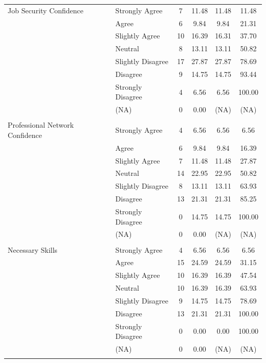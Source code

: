 \documentclass{article}
\begin{document}
\begin{longtable}{llcccc}
        Job Security Confidence & Strongly Agree & 7 & 11.48 & 11.48 & 11.48 \\
        & Agree & 6 & 9.84 & 9.84 & 21.31 \\
        & Slightly Agree & 10 & 16.39 & 16.31 & 37.70 \\
        & Neutral & 8 & 13.11 & 13.11 & 50.82 \\
        & Slightly Disagree & 17 & 27.87 & 27.87 & 78.69 \\
        & Disagree & 9 & 14.75 & 14.75 & 93.44 \\
        & Strongly Disagree & 4 & 6.56 & 6.56 & 100.00 \\
        & (NA) & 0 & 0.00 & (NA) & (NA)\\\\

        Professional Network Confidence & Strongly Agree & 4 & 6.56 & 6.56 & 6.56 \\
        & Agree & 6 & 9.84 & 9.84 & 16.39 \\
        & Slightly Agree & 7 & 11.48 & 11.48 & 27.87 \\
        & Neutral & 14 & 22.95 & 22.95 & 50.82 \\
        & Slightly Disagree & 8 & 13.11 & 13.11 & 63.93 \\
        & Disagree & 13 & 21.31 & 21.31 & 85.25 \\
        & Strongly Disagree & 0 & 14.75 & 14.75 & 100.00 \\
        & (NA) & 0 & 0.00 & (NA) & (NA)\\\\

        Necessary Skills & Strongly Agree & 4 & 6.56 & 6.56 & 6.56 \\
        & Agree & 15 & 24.59 & 24.59 & 31.15 \\
        & Slightly Agree & 10 & 16.39 & 16.39 & 47.54 \\
        & Neutral & 10 & 16.39 & 16.39 & 63.93 \\
        & Slightly Disagree & 9 & 14.75 & 14.75 & 78.69 \\
        & Disagree & 13 & 21.31 & 21.31 & 100.00 \\
        & Strongly Disagree & 0 & 0.00 & 0.00 & 100.00\\
        & (NA) & 0 & 0.00 & (NA) & (NA)\\\\


\end{longtable}
\end{document}
